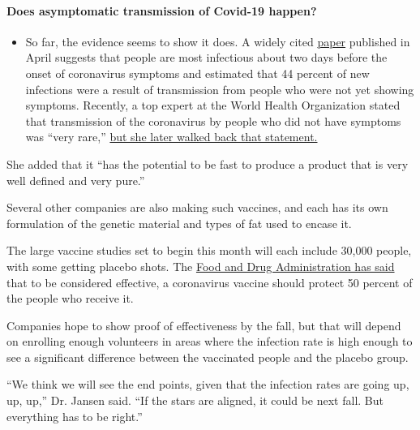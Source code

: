 \begin{itemize}
{  \paragraph{Does asymptomatic transmission of Covid-19
  happen?}\label{does-asymptomatic-transmission-of-covid-19-happen}}

  \begin{itemize}
  \tightlist
  \item
    So far, the evidence seems to show it does. A widely cited
    \href{https://www.nature.com/articles/s41591-020-0869-5}{paper}
    published in April suggests that people are most infectious about
    two days before the onset of coronavirus symptoms and estimated that
    44 percent of new infections were a result of transmission from
    people who were not yet showing symptoms. Recently, a top expert at
    the World Health Organization stated that transmission of the
    coronavirus by people who did not have symptoms was ``very rare,''
    \href{https://www.nytimes.com/2020/06/09/world/coronavirus-updates.html?action=click\&pgtype=Article\&state=default\&region=MAIN_CONTENT_3\&context=storylines_faq\#link-1f302e21}{but
    she later walked back that statement.}
  \end{itemize}
\end{itemize}

She added that it ``has the potential to be fast to produce a product
that is very well defined and very pure.''

Several other companies are also making such vaccines, and each has its
own formulation of the genetic material and types of fat used to encase
it.

The large vaccine studies set to begin this month will each include
30,000 people, with some getting placebo shots. The
\href{https://www.fda.gov/regulatory-information/search-fda-guidance-documents/development-and-licensure-vaccines-prevent-covid-19}{Food
and Drug Administration has said} that to be considered effective, a
coronavirus vaccine should protect 50 percent of the people who receive
it.

Companies hope to show proof of effectiveness by the fall, but that will
depend on enrolling enough volunteers in areas where the infection rate
is high enough to see a significant difference between the vaccinated
people and the placebo group.

``We think we will see the end points, given that the infection rates
are going up, up, up,'' Dr. Jansen said. ``If the stars are aligned, it
could be next fall. But everything has to be right.''

